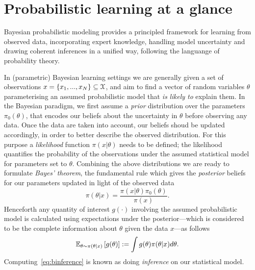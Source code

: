 \section{Probabilistic learning at  a glance}
\label{sec:b-bayesian-inference}

Bayesian probabilistic modeling provides a principled framework for  learning from observed data, incorporating expert knowledge, handling model uncertainty and drawing coherent inferences in a unified way, following the languange of probability theory.

In (parametric) Bayesian learning settings we are generally given a set of observations $x = \{x_1,...,x_N\} \subseteq \mathcal{X}$, and aim to find a vector of random variables $\theta $ parameterising an assumed probabilistic model that \emph{is likely to} explain them. In the Bayesian paradigm, we first assume a \emph{prior} distribution over the parameters $\pi_0(\theta)$, that encodes our beliefs about the uncertainty in $\theta$ before observing any data. Once the data are taken into account, our beliefs shoud be updated accordingly, in order to better describe the observed distribution. For this purpose a \emph{likelihood} function $\pi(x|\theta)$ needs to be defined; the likelihood quantifies the probability of the observations under the assumed statistical model for parameters set to $\theta$. Combining the above distributions we are ready to formulate \emph{Bayes' theorem}, the fundamental rule which gives the \emph{posterior} beliefs for our parameters updated in light of the observed data
\[
\pi(\theta|x) = \frac{\pi(x|\theta)\pi_0(\theta)}{\pi(x)}.
\label{eq:bbayes-rule}
\] 
Henceforth any quantity of interest $g(\cdot)$ involving the assumed probabilistic model is calculated using expectations under the posterior---which is considered to be the complete information about $\theta$ given the data $x$---as follows
\[
\mathbb{E}_{\theta \sim \pi(\theta|x)}\left[g(\theta)\right] := \int g(\theta) \pi(\theta|x) d\theta.
\label{eq:binference}
\]
Computing~\cref{eq:binference} is known as doing \emph{inference} on our statistical model.


